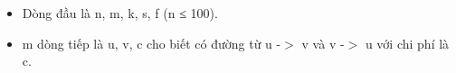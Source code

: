 \begin{itemize}
	\item Dòng đầu là n, m, k, s, f (n ≤ 100).
	\item m dòng tiếp là u, v, c cho biết có đường từ u -$>$ v và v -$>$ u với chi phí là c.
\end{itemize}

\